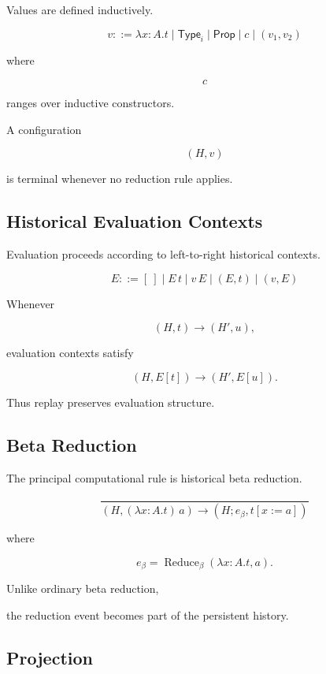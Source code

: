 \documentclass[12pt,oneside]{article}
\theoremstyle{definition}
\theoremstyle{remark}
\newcommand{\Type}{\mathsf{Type}}
\newcommand{\Prop}{\mathsf{Prop}}
\begin{document}
Values are defined inductively.

\[
v
::=
\lambda x:A.t
\mid
\Type_i
\mid
\Prop
\mid
c
\mid
(v_1,v_2)
\]

where

\[
c
\]

ranges over inductive constructors.

A configuration

\[
(H,v)
\]

is terminal whenever no reduction rule applies.


\subsection{Historical Evaluation Contexts}

Evaluation proceeds according to left-to-right historical contexts.

\[
E
::=
[\ ]
\mid
E\,t
\mid
v\,E
\mid
(E,t)
\mid
(v,E)
\]

Whenever

\[
(H,t)
\rightarrow
(H',u),
\]

evaluation contexts satisfy

\[
(H,E[t])
\rightarrow
(H',E[u]).
\]

Thus replay preserves evaluation structure.


\subsection{Beta Reduction}

The principal computational rule is historical beta reduction.

\[
\frac{}{
(H,
(\lambda x:A.t)\,a)
\longrightarrow
(H;e_\beta,
t[x:=a])
}
\]

where

\[
e_\beta
=
\operatorname{Reduce}_\beta
(\lambda x:A.t,a).
\]

Unlike ordinary beta reduction,

the reduction event becomes part of the persistent history.


\subsection{Projection}
\end{document}

